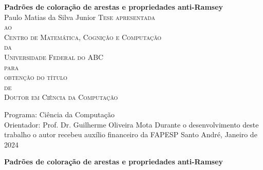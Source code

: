 \documentclass[12pt,a4paper]{book}
\begin{document}
 
\frontmatter 
\fancyhead[RO]{{\footnotesize\rightmark}\hspace{2em}\thepage}
\setcounter{tocdepth}{2}
\setcounter{secnumdepth}{3}
\fancyhead[LE]{\thepage\hspace{2em}\footnotesize{\leftmark}}
\fancyhead[RE,LO]{}
\fancyhead[RO]{{\footnotesize\rightmark}\hspace{2em}\thepage}

\doublespacing %

\thispagestyle{empty}
\begin{center}
    \vspace*{2cm}
    \textbf{\Large{Padrões de coloração de arestas e propriedades anti-Ramsey }}\\
    
    \vspace*{1.1cm}
    \Large{Paulo Matias da Silva Junior}    
    \vskip 2cm
    \textsc{
    Tese apresentada\\[-0.3cm] 
    ao\\[-0.3cm]
    Centro de Matemática, Cognição e Computação\\[-0.3cm]
    da\\[-0.3cm]
    Universidade Federal do ABC\\[-0.3cm]
    para\\[-0.3cm]
    obtenção do título\\[-0.3cm]
    de\\[-0.3cm]
    Doutor em Ciência da Computação}
    
    \vskip 1.3cm
    Programa: Ciência da Computação\\
    Orientador: Prof. Dr. Guilherme Oliveira Mota
   	\vskip 1cm
    \normalsize{Durante o desenvolvimento deste trabalho o autor recebeu auxílio
    financeiro da FAPESP}    
    \vskip 0.4cm
    \normalsize{Santo André, Janeiro de 2024}
\end{center}


%
%
%
\newpage
\thispagestyle{empty}
    \begin{center}
        \vspace*{2.3 cm}
        \textbf{\Large{Padrões de coloração de arestas e propriedades anti-Ramsey }}\\
        \vspace*{2 cm}
    \end{center}
\end{document}
